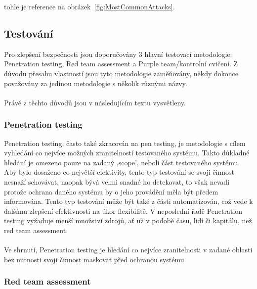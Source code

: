 tohle je reference na obrázek~\ref{fig:MostCommonAttacks}.




\subsection{Testování}
Pro zlepšení bezpečnosti jsou doporučovány 3 hlavní testovací metodologie: Penetration testing, Red team assessment a Purple team/kontrolní cvičení.
Z důvodu přesahu vlastností jsou tyto metodologie zaměňovány, někdy dokonce považovány za jedinou metodologie s několik různými názvy.\cite{securityInteligence_pen_test_red_team_purple_team}

\paragraph{}
Právě z těchto důvodů jsou v následujícím textu vysvětleny.

\subsubsection{Penetration testing}

Penetration testing, často také zkracován na pen testing, je metodologie s cílem vyhledání co nejvíce možných zranitelností testovaného systému.
Takto důkladné hledání je omezeno pouze na zadaný ,scope', neboli část testovaného systému.
Aby bylo dosaženo co největší efektivity, tento typ testování se svoji činnost nesnaží schovávat, naopak bývá velmi snadné ho detekovat, to však nevadí protože ochrana daného systému by o jeho provádění měla být předem informována.
Tento typ testování může být také z části automatizován, což vede k dalšímu zlepšení efektivnosti na úkor flexibilitě.
V neposlední řadě Penetration testing vyžaduje menší množství zdrojů, ať už v podobě času, lidí či kapitálu, než red team assessment.
\paragraph{}
Ve shrnutí, Penetration testing je hledání co nejvíce zranitelnosti v zadané oblasti bez nutnosti svoji činnost maskovat před ochranou systému.\cite{securityInteligence_pen_test_red_team_purple_team, lootsec_pen_test_vs_red_team, astra_pen_test_vs_red_teaming}


\subsubsection{Red team assessment}

